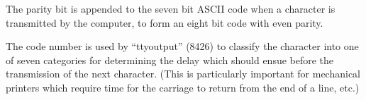 \bigskip

The parity bit is appended to the seven
bit ASCII code when a character is
transmitted by the computer, to form an
eight bit code with even parity.

The code number is used by ``ttyoutput''
(8426) to classify the character into
one of seven categories for determining
the delay which should ensue before the
transmission of the next character.
(This is particularly important for
mechanical printers which require time
for the carriage to return from the end
of a line, etc.)
